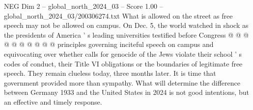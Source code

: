 \begin{textsample}{NEG Dim 2 – global\_north\_2024\_03 – Score 1.00 – global\_north\_2024\_03/200306274.txt}
What is allowed on the street as free speech may not be allowed on campus.
On Dec. 5, the world watched in shock as the presidents of America ' s leading universities testified before Congress @ @ @ @ @ @ @ @ @ @ principles governing inciteful speech on campus and equivocating over whether calls for genocide of the Jews violate their school ' s codes of conduct, their Title VI obligations or the boundaries of legitimate free speech.
They remain clueless today, three months later.
It is time that government provided more than sympathy.
What will determine the difference between Germany 1933 and the United States in 2024 is not good intentions, but an effective and timely response.

\end{textsample}
